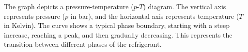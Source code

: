 The graph depicts a pressure-temperature (\( p \)-\( T \)) diagram. The vertical axis represents pressure (\( p \) in bar), and the horizontal axis represents temperature (\( T \) in Kelvin). The curve shows a typical phase boundary, starting with a steep increase, reaching a peak, and then gradually decreasing. This represents the transition between different phases of the refrigerant.